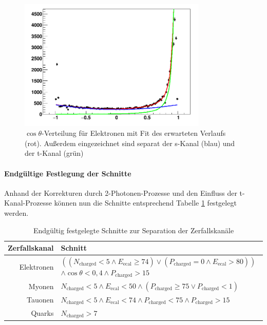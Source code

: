 \begin{figure}
	\centering
	\includegraphics[width=0.8\textwidth]{../figures/stkanal.png}
	\caption[$\cos\theta$-Verteilung für Elektronen mit Fit des erwarteten Verlaufs]{$\cos\theta$-Verteilung für Elektronen mit Fit des erwarteten Verlaufs (rot). Außerdem eingezeichnet sind separat der s-Kanal (blau) und der t-Kanal (grün)}
	\label{fig:stkanal}
\end{figure}

\paragraph{Endgültige Festlegung der Schnitte}
Anhand der Korrekturen durch 2-Photonen-Prozesse und den Einfluss der t-Kanal-Prozesse können nun die Schnitte entsprechend Tabelle \ref{tab:finalcuts} festgelegt werden.

\begin{table}
	\centering
	\begin{tabular}{r|p{11 cm}}
		\textbf{Zerfallskanal}&\textbf{Schnitt}\\\hline
		Elektronen&$\left(\left(N_\text{charged}<5 \land E_\text{ecal}\geq74\right) \lor \left(P_\text{charged}=0\land E_\text{ecal}>80\right)\right)$\newline$\land\cos\theta<0,4\land P_\text{charged}>15$\\
		Myonen&$N_\text{charged}<5 \land E_\text{ecal}<50 \land \left(P_\text{charged}\geq 75 \lor P_\text{charged}<1\right)$\\
		Tauonen&$N_\text{charged}<5 \land E_\text{ecal}<74 \land P_\text{charged}< 75\land P_\text{charged}>15$\\
		Quarks&$N_\text{charged}>7$\\
	\end{tabular}
	\caption{Endgültig festgelegte Schnitte zur Separation der Zerfallskanäle}
	\label{tab:finalcuts}
\end{table}

